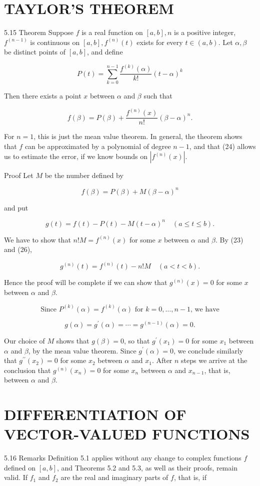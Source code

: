 \documentclass[10pt]{article}
\begin{document}
\section{TAYLOR'S THEOREM}
5.15 Theorem Suppose $f$ is a real function on $[a, b], n$ is a positive integer, $f^{(n-1)}$ is continuous on $[a, b], f^{(n)}(t)$ exists for every $t \in(a, b)$. Let $\alpha, \beta$ be distinct points of $[a, b]$, and define

$$
P(t)=\sum_{k=0}^{n-1} \frac{f^{(k)}(\alpha)}{k !}(t-\alpha)^{k}
$$

Then there exists a point $x$ between $\alpha$ and $\beta$ such that

$$
f(\beta)=P(\beta)+\frac{f^{(n)}(x)}{n !}(\beta-\alpha)^{n} .
$$

For $n=1$, this is just the mean value theorem. In general, the theorem shows that $f$ can be approximated by a polynomial of degree $n-1$, and that (24) allows us to estimate the error, if we know bounds on $\left|f^{(n)}(x)\right|$.

Proof Let $M$ be the number defined by

$$
f(\beta)=P(\beta)+M(\beta-\alpha)^{n}
$$

and put

$$
g(t)=f(t)-P(t)-M(t-\alpha)^{n} \quad(a \leq t \leq b) .
$$

We have to show that $n ! M=f^{(n)}(x)$ for some $x$ between $\alpha$ and $\beta$. By (23) and (26),

$$
g^{(n)}(t)=f^{(n)}(t)-n ! M \quad(a<t<b) .
$$

Hence the proof will be complete if we can show that $g^{(n)}(x)=0$ for some $x$ between $\alpha$ and $\beta$.

$$
\text { Since } P^{(k)}(\alpha)=f^{(k)}(\alpha) \text { for } k=0, \ldots, n-1 \text {, we have }
$$

$$
g(\alpha)=g^{\prime}(\alpha)=\cdots=g^{(n-1)}(\alpha)=0 .
$$

Our choice of $M$ shows that $g(\beta)=0$, so that $g^{\prime}\left(x_{1}\right)=0$ for some $x_{1}$ between $\alpha$ and $\beta$, by the mean value theorem. Since $g^{\prime}(\alpha)=0$, we conclude similarly that $g^{\prime \prime}\left(x_{2}\right)=0$ for some $x_{2}$ between $\alpha$ and $x_{1}$. After $n$ steps we arrive at the conclusion that $g^{(n)}\left(x_{n}\right)=0$ for some $x_{n}$ between $\alpha$ and $x_{n-1}$, that is, between $\alpha$ and $\beta$.

\section{DIFFERENTIATION OF VECTOR-VALUED FUNCTIONS}
5.16 Remarks Definition 5.1 applies without any change to complex functions $f$ defined on $[a, b]$, and Theorems 5.2 and 5.3, as well as their proofs, remain valid. If $f_{1}$ and $f_{2}$ are the real and imaginary parts of $f$, that is, if
\end{document}
